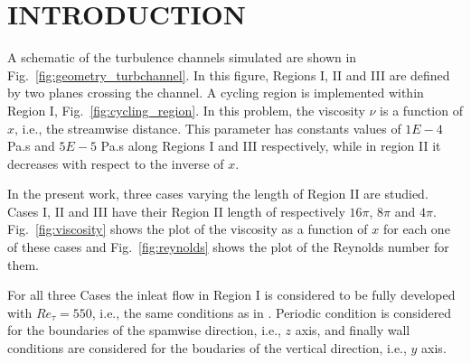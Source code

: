 \documentclass[twocolumn,10pt]{asme2e}
\begin{document}
\begin{nomenclature}
\end{nomenclature}


\section*{INTRODUCTION}

A schematic of the turbulence channels simulated are shown in Fig.~\ref{fig:geometry_turbchannel}. In this figure, Regions I, II and III are defined by two planes crossing the channel. A cycling region is implemented within Region I, Fig.~\ref{fig:cycling_region}.
In this problem, the viscosity \(\nu\) is a function of \(x\), i.e., the streamwise distance. This parameter has constants values of \(1E-4\) Pa.s and \(5E-5\) Pa.s along Regions I and III respectively, while in region II it decreases with respect to the inverse of \(x\).

In the present work, three cases varying the length of Region II are studied. Cases I, II and III have their Region II length of respectively \(16\pi\), \(8\pi\) and \(4\pi\). Fig.~\ref{fig:viscosity} shows the plot of the viscosity as a function of \(x\) for each one of these cases and Fig.~\ref{fig:reynolds} shows the plot of the Reynolds number for them.

For all three Cases the inleat flow in Region I is considered to be fully developed with \(Re_{\tau}=550\), i.e., the same conditions as in \cite{hoyas2008}. Periodic condition is considered for the boundaries of the spamwise direction, i.e., \(z\) axis, and finally wall conditions are considered for the boudaries of the vertical direction, i.e., \(y\) axis.
\end{document}
